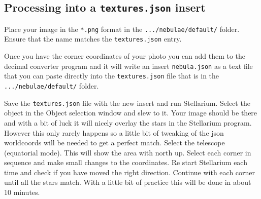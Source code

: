 \subsection{\texorpdfstring{Processing into a \texttt{textures.json}
insert}{Processing into a textures.json insert}}\label{processing-into-a-textures.json-insert}

Place your image in the \texttt{*.png} format in the
\texttt{.../nebulae/default/} folder. Ensure that the name matches the
\texttt{textures.json} entry.

Once you have the corner coordinates of your photo you can add them to
the decimal converter program and it will write an insert
\texttt{nebula.json} as a text file that you can paste directly into the
\texttt{textures.json} file that is in the \texttt{.../nebulae/default/}
folder.

Save the \texttt{textures.json} file with the new insert and run
Stellarium. Select the object in the Object selection window and slew to
it. Your image should be there and with a bit of luck it will nicely
overlay the stars in the Stellarium program. However this only rarely
happens so a little bit of tweaking of the json worldcoords will be
needed to get a perfect match. Select the telescope (equatorial mode).
This will show the area with north up. Select each corner in sequence
and make small changes to the coordinates. Re start Stellarium each time
and check if you have moved the right direction. Continue with each
corner until all the stars match. With a little bit of practice this
will be done in about 10 minutes.


